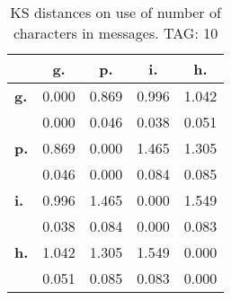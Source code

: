 \begin{table}[h!]
\begin{center}
\begin{tabular}{| l || c | c | c | c |}\hline
 & {\bf g.} & {\bf p.} & {\bf i.} & {\bf h.} \\\hline\hline
{\bf g.} & 0.000 & 0.869 & 0.996 & 1.042 \\
{\bf } & 0.000 & 0.046 & 0.038 & 0.051 \\\hline
{\bf p.} & 0.869 & 0.000 & 1.465 & 1.305 \\
{\bf } & 0.046 & 0.000 & 0.084 & 0.085 \\\hline
{\bf i.} & 0.996 & 1.465 & 0.000 & 1.549 \\
{\bf } & 0.038 & 0.084 & 0.000 & 0.083 \\\hline
{\bf h.} & 1.042 & 1.305 & 1.549 & 0.000 \\
{\bf } & 0.051 & 0.085 & 0.083 & 0.000 \\\hline
\end{tabular}
\caption{KS distances on use of number of characters in messages. TAG: 10}
\end{center}
\end{table}